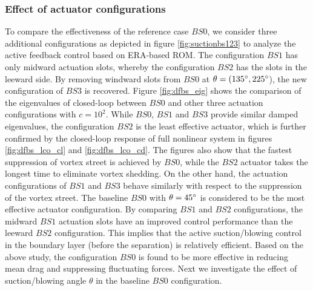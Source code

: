 \documentclass[standard]{jfm}
\begin{document}
\subsubsection{Effect of actuator configurations}\label{sec:configuration}
To compare the effectiveness of the reference case $BS0$, we consider three 
additional configurations as depicted in figure \ref{fig:suctionbs123} to analyze the active feedback control based on ERA-based ROM.
%
The configuration $BS1$ has only midward actuation slots, whereby the configuration $BS2$ has the 
slots in the leeward side. By removing windward slots from $BS0$ 
at $\theta=(135 \degree, 225 \degree$),  the new configuration of $BS3$ is recovered.
%
Figure \ref{fig:dfbs_eig} shows the comparison of the eigenvalues 
of closed-loop  between $BS0$ and other three actuation configurations with $c=10^2$. 
While $BS0$, $BS1$ and $BS3$ provide similar 
damped eigenvalues, the configuration $BS2$ is the least effective actuator, which is further confirmed 
by the closed-loop response of full nonlinear system in 
figures \ref{fig:dfbs_lco_cl} and \ref{fig:dfbs_lco_cd}.
%
The figures also show that the fastest suppression of vortex street  
is achieved by $BS0$, while the $BS2$ actuator takes the longest time to eliminate vortex shedding. 
On the other hand, the actuation configurations of $BS1$ and $BS3$ 
behave similarly with respect to the suppression of the vortex street. 
The baseline $BS0$ with $\theta=45 \degree$ is considered 
to be the most effective actuator configuration. 
%
By comparing $BS1$ and $BS2$ configurations, the midward $BS1$ actuation slots 
have an improved control performance than the leeward $BS2$ configuration. 
This implies that the active suction/blowing control in the boundary layer (before 
the separation) is relatively efficient.
%
Based on the above study, the configuration $BS0$ is found to be more 
effective in reducing mean drag and suppressing fluctuating forces.
Next we investigate the effect of suction/blowing angle $\theta$ 
in the baseline $BS0$ configuration.
\end{document}

